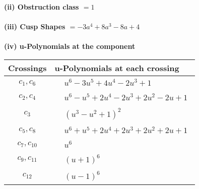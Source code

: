 \documentclass[1p]{elsarticle_modified}
\theoremstyle{definition}
\begin{document}
\flushleft \textbf{(ii) Obstruction class $= 1$}\\~\\
\flushleft \textbf{(iii) Cusp Shapes $= -3 a^4+8 a^3-8 a+4$}\\~\\
\newpage\renewcommand{\arraystretch}{1}
\flushleft \textbf{(iv) u-Polynomials at the component}\newline \\
\begin{tabular}{m{50pt}|m{274pt}}
Crossings & \hspace{64pt}u-Polynomials at each crossing \\
\hline $$\begin{aligned}c_{1},c_{6}\end{aligned}$$&$\begin{aligned}
&u^6-3 u^5+4 u^4-2 u^3+1
\end{aligned}$\\
\hline $$\begin{aligned}c_{2},c_{4}\end{aligned}$$&$\begin{aligned}
&u^6- u^5+2 u^4-2 u^3+2 u^2-2 u+1
\end{aligned}$\\
\hline $$\begin{aligned}c_{3}\end{aligned}$$&$\begin{aligned}
&(u^3- u^2+1)^2
\end{aligned}$\\
\hline $$\begin{aligned}c_{5},c_{8}\end{aligned}$$&$\begin{aligned}
&u^6+u^5+2 u^4+2 u^3+2 u^2+2 u+1
\end{aligned}$\\
\hline $$\begin{aligned}c_{7},c_{10}\end{aligned}$$&$\begin{aligned}
&u^6
\end{aligned}$\\
\hline $$\begin{aligned}c_{9},c_{11}\end{aligned}$$&$\begin{aligned}
&(u+1)^6
\end{aligned}$\\
\hline $$\begin{aligned}c_{12}\end{aligned}$$&$\begin{aligned}
&(u-1)^6
\end{aligned}$\\
\hline
\end{tabular}\\~\\
\end{document}
